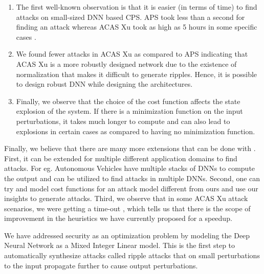 \begin{enumerate}
    \item The first well-known observation is that it is easier (in terms of time) to find attacks on small-sized DNN based CPS. APS took less than a second for finding an attack whereas ACAS Xu took as high as 5 hours in some specific cases . 

\item We found fewer attacks in ACAS Xu as compared to APS indicating  that ACAS Xu is a more robustly designed network due to the existence of normalization that makes it difficult to generate ripples. Hence, it is possible to design robust DNN while designing the architectures. 

\item Finally, we observe that the choice of the cost function affects the state explosion of the system. If there is a minimization function on the input perturbations, it takes much longer to compute and can also lead to explosions  in certain cases as compared to having no minimization function. 
\end{enumerate}






Finally, we believe that there are many more extensions that can be done with \tool. First, it can be extended for multiple different application domains to find attacks. For eg.  Autonomous Vehicles have multiple stacks of DNNs to compute the output and \tool can be utilized to find attacks in multiple DNNs. Second, one can try and model cost functions for an attack model different from ours and use our insights to generate attacks. Third, we observe that in some ACAS Xu attack scenarios, we were getting a time-out , which tells us that there is the scope of improvement in the heuristics we have currently proposed for a speedup. 

\iffalse
We have addressed security as an optimization problem by modeling the Deep Neural Network as a Mixed Integer Linear model. This is the first step to automatically synthesize attacks called ripple attacks that on small perturbations to the input propagate further to cause output perturbations. 

